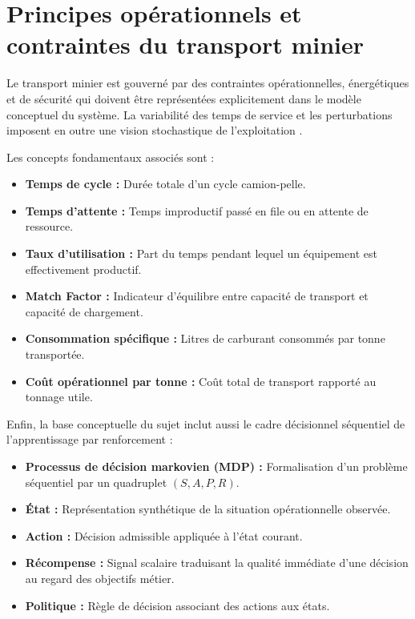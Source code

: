 \documentclass[11pt,a4paper]{report}
\begin{document}
\section{Principes opérationnels et contraintes du transport minier}
\label{sec:limites}

Le transport minier est gouverné par des contraintes opérationnelles, énergétiques et de sécurité qui doivent être représentées explicitement dans le modèle conceptuel du système. La variabilité des temps de service et les perturbations imposent en outre une vision stochastique de l'exploitation \cite{Afrapoli2017, BurakOzdemir2019, ShivPrakashUpadhyay2017}.

Les concepts fondamentaux associés sont :
\begin{itemize}
    \item \textbf{Temps de cycle :} Durée totale d'un cycle camion-pelle.
    \item \textbf{Temps d'attente :} Temps improductif passé en file ou en attente de ressource.
    \item \textbf{Taux d'utilisation :} Part du temps pendant lequel un équipement est effectivement productif.
    \item \textbf{Match Factor :} Indicateur d'équilibre entre capacité de transport et capacité de chargement.
    \item \textbf{Consommation spécifique :} Litres de carburant consommés par tonne transportée.
    \item \textbf{Coût opérationnel par tonne :} Coût total de transport rapporté au tonnage utile.
\end{itemize}

Enfin, la base conceptuelle du sujet inclut aussi le cadre décisionnel séquentiel de l'apprentissage par renforcement :
\begin{itemize}
    \item \textbf{Processus de décision markovien (MDP) :} Formalisation d'un problème séquentiel par un quadruplet \((S, A, P, R)\).
    \item \textbf{État :} Représentation synthétique de la situation opérationnelle observée.
    \item \textbf{Action :} Décision admissible appliquée à l'état courant.
    \item \textbf{Récompense :} Signal scalaire traduisant la qualité immédiate d'une décision au regard des objectifs métier.
    \item \textbf{Politique :} Règle de décision associant des actions aux états.
\end{itemize}
\end{document}
